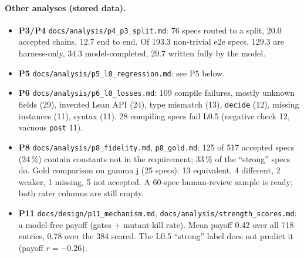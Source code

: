 \documentclass[11pt,a4paper]{article}
\newcommand{\code}[1]{\texttt{#1}}
\newcommand{\file}[1]{\texttt{#1}}
\begin{document}
\paragraph{Other analyses (stored data).}
\begin{itemize}
  \item \textbf{P3/P4} \file{docs/analysis/p4\_p3\_split.md}: 76 specs routed to a split, 20.0 accepted
        chains, 12.7 end to end. Of 193.3 non-trivial e2e specs, 129.3 are harness-only, 34.3 model-completed,
        29.7 written fully by the model.
  \item \textbf{P5} \file{docs/analysis/p5\_l0\_regression.md}: see P5 below.
  \item \textbf{P6} \file{docs/analysis/p6\_l0\_losses.md}: 109 compile failures, mostly unknown fields
        (29), invented Lean API (24), type mismatch (13), \code{decide} (12), missing instances (11),
        syntax (11). 28 compiling specs fail L0.5 (negative check 12, vacuous \code{post} 11).
  \item \textbf{P8} \file{docs/analysis/p8\_fidelity.md}, \file{p8\_gold.md}: 125 of 517 accepted specs
        (24\,\%) contain constants not in the requirement; 33\,\% of the ``strong'' specs do. Gold
        comparison on gamma j (25 specs): 13 equivalent, 4 different, 2 weaker, 1 missing, 5 not accepted.
        A 60-spec human-review sample is ready; both rater columns are still empty.
  \item \textbf{P11} \file{docs/design/p11\_mechanism.md}, \file{docs/analysis/strength\_scores.md}:
        a model-free payoff (gates + mutant-kill rate). Mean payoff 0.42 over all 718 entries, 0.78 over
        the 384 scored. The L0.5 ``strong'' label does not predict it (payoff $r = -0.26$).
\end{itemize}
\end{document}
